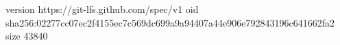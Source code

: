 version https://git-lfs.github.com/spec/v1
oid sha256:02277cc07ec2f4155ec7c569dc699a9a94407a44e906e792843196c641662fa2
size 43840
